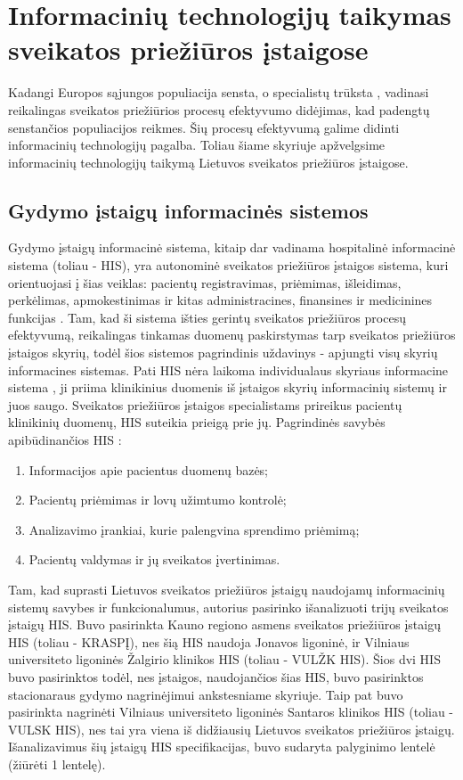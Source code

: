\section{Informacinių technologijų taikymas sveikatos priežiūros įstaigose}
 Kadangi Europos sąjungos populiacija sensta, o specialistų trūksta \cite{Organization2012} \cite{Eurostat}, vadinasi reikalingas sveikatos priežiūrios procesų efektyvumo didėjimas, kad padengtų senstančios populiacijos reikmes. Šių procesų efektyvumą galime didinti informacinių technologijų pagalba. Toliau šiame skyriuje apžvelgsime informacinių technologijų taikymą Lietuvos sveikatos priežiūros įstaigose.

\subsection{Gydymo įstaigų informacinės sistemos}
Gydymo įstaigų informacinė sistema, kitaip dar vadinama hospitalinė informacinė sistema (toliau - HIS), yra autonominė sveikatos priežiūros įstaigos sistema, kuri orientuojasi į šias veiklas: pacientų registravimas, priėmimas, išleidimas, perkėlimas, apmokestinimas ir kitas administracines, finansines ir medicinines funkcijas \cite{Sabooniha2012}. Tam, kad ši sistema išties gerintų sveikatos priežiūros procesų efektyvumą, reikalingas tinkamas duomenų paskirstymas tarp sveikatos priežiūros įstaigos skyrių, todėl šios sistemos pagrindinis uždavinys - apjungti visų skyrių informacines sistemas. Pati HIS nėra laikoma individualaus skyriaus informacine sistema \cite{JuliusGriskevicius}, ji priima klinikinius duomenis iš įstaigos skyrių informacinių sistemų ir juos saugo. Sveikatos priežiūros įstaigos specialistams prireikus pacientų klinikinių duomenų, HIS suteikia prieigą prie jų. Pagrindinės savybės apibūdinančios HIS \cite{JuliusGriskevicius}: 
\begin{enumerate}
    \item Informacijos apie pacientus duomenų bazės;
    \item Pacientų priėmimas ir lovų užimtumo kontrolė;
    \item Analizavimo įrankiai, kurie palengvina sprendimo priėmimą;
    \item Pacientų valdymas ir jų sveikatos įvertinimas.
\end{enumerate}


Tam, kad suprasti Lietuvos sveikatos priežiūros įstaigų naudojamų informacinių sistemų savybes ir funkcionalumus, autorius pasirinko išanalizuoti trijų sveikatos įstaigų HIS. Buvo pasirinkta Kauno regiono asmens sveikatos priežiūros įstaigų HIS (toliau - KRASPĮ), nes šią HIS naudoja Jonavos ligoninė, ir Vilniaus universiteto ligoninės Žalgirio klinikos HIS (toliau - VULŽK HIS). Šios dvi HIS buvo pasirinktos todėl, nes įstaigos, naudojančios šias HIS, buvo pasirinktos stacionaraus gydymo nagrinėjimui ankstesniame skyriuje. Taip pat buvo pasirinkta nagrinėti Vilniaus universiteto ligoninės Santaros klinikos HIS (toliau - VULSK HIS), nes tai yra viena iš didžiausių Lietuvos sveikatos priežiūros įstaigų. Išanalizavimus šių įstaigų HIS specifikacijas, buvo sudaryta palyginimo lentelė (žiūrėti 1 lentelę). 

